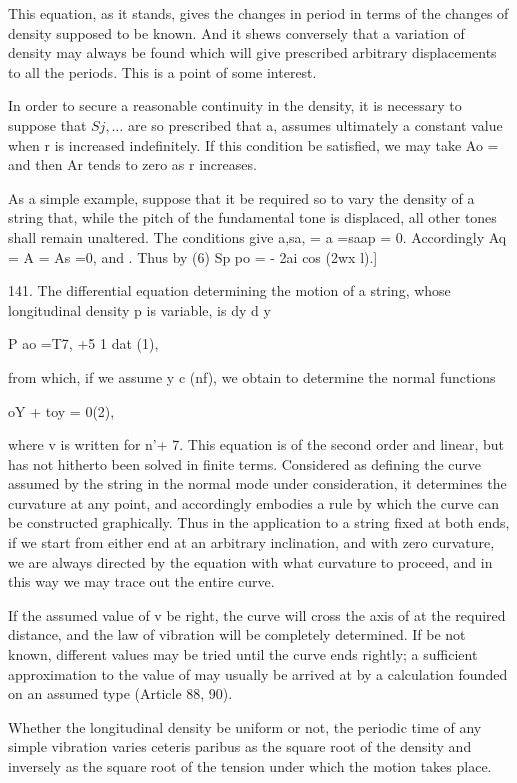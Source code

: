 This equation, as it stands, gives the changes in period in terms of the
changes of density supposed to be known. And it shews conversely that a
variation of density may always be found which will give prescribed arbitrary
displacements to all the periods. This is a point of some interest.

In order to secure a reasonable continuity in the density, it is necessary to
suppose that \(Sj, \ldots \) are so prescribed that a, assumes ultimately a
constant value when r is increased indefinitely. If this condition be
satisfied, we may take Ao = and then Ar tends to zero as r increases.

As a simple example, suppose that it be required so to vary the density of a
string that, while the pitch of the fundamental tone is displaced, all other
tones shall remain unaltered. The conditions give a,sa, = a =saap = 0.
Accordingly Aq = A = As =0, and .   Thus by (6)
Sp po = - 2ai cos (2wx l).]

141. The differential equation determining the motion of a string, whose
longitudinal density p is variable, is dy d y

P ao =T7, +5 1 dat (1),

from which, if we assume y c (nf), we obtain to determine the normal functions

oY + toy = 0(2),

where v is written for n'+ 7. This equation is of the second order and linear,
but has not hitherto been solved in finite terms. Considered as defining the
curve assumed by the string in the normal mode under consideration, it
determines the curvature at any point, and accordingly embodies a rule by which
the curve can be constructed graphically. Thus in the application to a string
fixed at both ends, if we start from either end at an arbitrary inclination,
and with zero curvature, we are always directed by the equation with what
curvature to proceed, and in this way we may trace out the entire curve.

If the assumed value of v be right, the curve will cross the axis of at the
required distance, and the law of vibration will be completely determined. If
be not known, different values may be tried until the curve ends rightly; a
sufficient approximation to the value of may usually be arrived at by a
calculation founded on an assumed type (Article 88, 90).

Whether the longitudinal density be uniform or not, the periodic time of any
simple vibration varies ceteris paribus as the square root of the density and
inversely as the square root of the tension under which the motion takes place.

